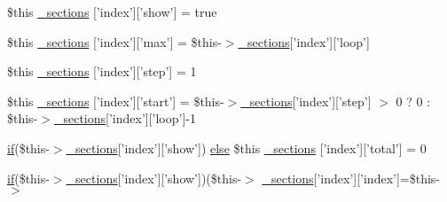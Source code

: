\begin{DoxyCompactItemize}
\item 
\$this \hyperlink{34d6fa4bfd5eef6424a9ddc74a166350_2_06_06-19_05_06_06-1910644431_05basicindex_8tpl_8php_a29b37f249780f8e4baf79099f5530d56}{\-\_\-sections} \mbox{[}'index'\mbox{]}\mbox{[}'show'\mbox{]} = true
\item 
\$this \hyperlink{34d6fa4bfd5eef6424a9ddc74a166350_2_06_06-19_05_06_06-1910644431_05basicindex_8tpl_8php_a1ffc1a01b76c9534acee0093859896c4}{\-\_\-sections} \mbox{[}'index'\mbox{]}\mbox{[}'max'\mbox{]} = \$this-\/$>$\hyperlink{_06_06127_05_06_0612781687_05pkgelementindex_8tpl_8php_a9e3d26b39edfe29c3f29b8035ef33828}{\-\_\-sections}\mbox{[}'index'\mbox{]}\mbox{[}'loop'\mbox{]}
\item 
\$this \hyperlink{34d6fa4bfd5eef6424a9ddc74a166350_2_06_06-19_05_06_06-1910644431_05basicindex_8tpl_8php_acff296ad92d2af603afe8598b42de5ae}{\-\_\-sections} \mbox{[}'index'\mbox{]}\mbox{[}'step'\mbox{]} = 1
\item 
\$this \hyperlink{34d6fa4bfd5eef6424a9ddc74a166350_2_06_06-19_05_06_06-1910644431_05basicindex_8tpl_8php_a2f9452a85379234d14b435769aab3bfe}{\-\_\-sections} \mbox{[}'index'\mbox{]}\mbox{[}'start'\mbox{]} = \$this-\/$>$\hyperlink{_06_06127_05_06_0612781687_05pkgelementindex_8tpl_8php_a9e3d26b39edfe29c3f29b8035ef33828}{\-\_\-sections}\mbox{[}'index'\mbox{]}\mbox{[}'step'\mbox{]} $>$ 0 ? 0 \-: \$this-\/$>$\hyperlink{_06_06127_05_06_0612781687_05pkgelementindex_8tpl_8php_a9e3d26b39edfe29c3f29b8035ef33828}{\-\_\-sections}\mbox{[}'index'\mbox{]}\mbox{[}'loop'\mbox{]}-\/1
\item 
\hyperlink{_setup_8inc_8php_ad0184337b31d13763ec8751feff4aabe}{if}(\$this-\/$>$\hyperlink{_06_06127_05_06_0612781687_05pkgelementindex_8tpl_8php_a9e3d26b39edfe29c3f29b8035ef33828}{\-\_\-sections}\mbox{[}'index'\mbox{]}\mbox{[}'show'\mbox{]}) \*
\hyperlink{test__session_8php_a7ca5c3b9e4c46ab37c0418e95ddcfa36}{else} \$this \hyperlink{34d6fa4bfd5eef6424a9ddc74a166350_2_06_06-19_05_06_06-1910644431_05basicindex_8tpl_8php_aa7dfb1956b36dac3e2f02b82b6faa0dc}{\-\_\-sections} \mbox{[}'index'\mbox{]}\mbox{[}'total'\mbox{]} = 0
\item 
\hyperlink{_setup_8inc_8php_ad0184337b31d13763ec8751feff4aabe}{if}(\$this-\/$>$\hyperlink{_06_06127_05_06_0612781687_05pkgelementindex_8tpl_8php_a9e3d26b39edfe29c3f29b8035ef33828}{\-\_\-sections}\mbox{[}'index'\mbox{]}\mbox{[}'show'\mbox{]})(\$this-\/$>$\*
\hyperlink{_06_06127_05_06_0612781687_05pkgelementindex_8tpl_8php_a9e3d26b39edfe29c3f29b8035ef33828}{\-\_\-sections}\mbox{[}'index'\mbox{]}\mbox{[}'index'\mbox{]}=\$this-\/$>$\*

\end{DoxyCompactItemize}
